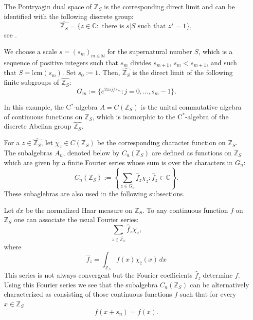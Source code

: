 \documentclass[12pt,reqno]{amsart}
\numberwithin{equation}{section}
\newcommand{\C}{{\mathbb C}}
\newcommand{\N}{{\mathbb N}}
\newcommand{\Z}{{\mathbb Z}}
\begin{document}
The Pontryagin dual space of $\Z_S$ is the corresponding direct limit and can be identified with the following discrete group:
\begin{equation*}
\widehat{\Z_S}=\{z\in\C: \textrm{ there is }s|S \textrm{ such that }z^s=1\},
\end{equation*}
see \cite{HeRo}.

We choose a scale  $s = (s_m)_{m\in\N}$ for the supernatural number $S$, which  is a sequence of positive integers such that $s_m$ divides $s_{m+1}$, $s_m<s_{m+1}$, and such that $S=\mathrm{lcm}(s_m)$. Set $s_0:=1$.
Then, $\widehat{\Z_S}$ is the direct limit of the following finite subgroups of $\widehat{\Z_S}$:
\begin{equation*}
G_m:=\{e^{2\pi ij/s_m}:j=0,\ldots,s_m-1\}.
\end{equation*}

In this example, the C$^*$-algebra $A=C(\Z_S)$ is the unital commutative algebra of continuous functions on $\Z_S$, which is isomorphic to the C$^*$-algebra of the discrete Abelian group $\widehat{\Z_S}$.

For a $z\in\widehat{\Z_S}$, let $\chi_z\in C(\Z_S)$ be the corresponding character function on $\Z_S$.  The subalgebras $A_n$, denoted below by $C_n(\Z_S)$ are defined as functions on $\Z_S$ which are given by a finite Fourier series whose sum is over the characters in $G_n$:
\begin{equation*}
C_n(\Z_S):=\left\{\sum_{z\in G_n}\hat f_z \chi_z: \hat f_z\in\C\right\}.
\end{equation*}
These subaglebras are also used in the following subsections.

Let $dx$ be the normalized Haar measure on $\Z_S$. To any continuous function $f$ on $\Z_S$ one can associate the usual Fourier series:
\begin{equation}\label{FSeries}
\sum_{z\in\widehat{\Z_S}}\hat f_z \chi_z,
\end{equation}
where
\begin{equation*}
\hat f_z=\int_{\Z_S}f(x) \chi_{\bar z}(x)\,dx
\end{equation*}
This series is not always convergent but the Fourier coefficients $\hat f_z$ determine $f$. Using this Fourier series we see that the
subalgebra $C_n(\Z_S)$ can be alternatively characterized as consisting of those continuous functions $f$ such that for every $x\in\Z_S$
\begin{equation*}
f(x+s_n)=f(x).
\end{equation*}
\end{document}
